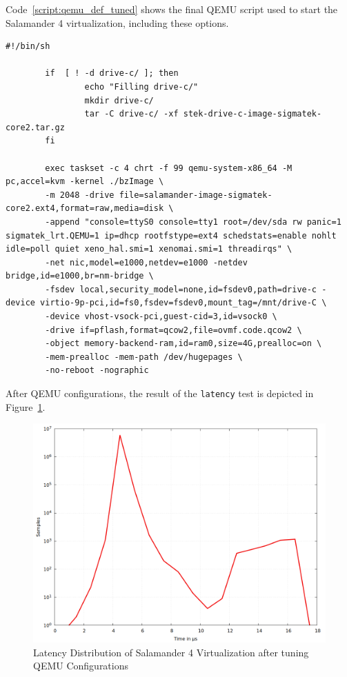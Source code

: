 \documentclass[MMR,Master,english]{style/twbook}
\begin{document}
\noindent Code~\ref{script:qemu_def_tuned} shows the final QEMU script used to start the Salamander 4 virtualization, including these options.

\clearpage

\begin{lstlisting}[name={Tuned QEMU Script for starting Salamander 4 Virtualization},label={script:qemu_def_tuned}]
		#!/bin/sh

		if  [ ! -d drive-c/ ]; then
				echo "Filling drive-c/"
				mkdir drive-c/
				tar -C drive-c/ -xf stek-drive-c-image-sigmatek-core2.tar.gz
		fi
			
		exec taskset -c 4 chrt -f 99 qemu-system-x86_64 -M pc,accel=kvm -kernel ./bzImage \
		-m 2048 -drive file=salamander-image-sigmatek-core2.ext4,format=raw,media=disk \
		-append "console=ttyS0 console=tty1 root=/dev/sda rw panic=1 sigmatek_lrt.QEMU=1 ip=dhcp rootfstype=ext4 schedstats=enable nohlt idle=poll quiet xeno_hal.smi=1 xenomai.smi=1 threadirqs" \
		-net nic,model=e1000,netdev=e1000 -netdev bridge,id=e1000,br=nm-bridge \
		-fsdev local,security_model=none,id=fsdev0,path=drive-c -device virtio-9p-pci,id=fs0,fsdev=fsdev0,mount_tag=/mnt/drive-C \
		-device vhost-vsock-pci,guest-cid=3,id=vsock0 \
		-drive if=pflash,format=qcow2,file=ovmf.code.qcow2 \
		-object memory-backend-ram,id=ram0,size=4G,prealloc=on \
		-mem-prealloc -mem-path /dev/hugepages \
		-no-reboot -nographic
\end{lstlisting}

\vspace{2em}
\noindent After QEMU configurations, the result of the \texttt{latency} test is depicted in Figure~\ref{fig:max_latency_rt_kernelparam_host_qemu}.

\begin{figure}[H]
	\centering
	\includegraphics[width=0.7\columnwidth]{img/implementation/gnuplot_max_latency_rt_kernelparam_host_qemu.png}
	\caption[Latency Distribution of Salamander 4 after QEMU Configurations]{Latency Distribution of Salamander 4 Virtualization after tuning QEMU Configurations}
	\label{fig:max_latency_rt_kernelparam_host_qemu}
\end{figure}
\end{document}
